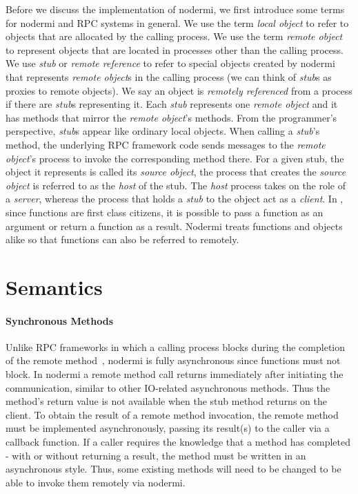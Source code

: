 Before we discuss the implementation of nodermi,
we first introduce some terms for nodermi and
RPC systems in general.
We use the term \emph{local object}
to refer to objects that are allocated by the calling process.
We use the term \emph{remote object} to represent objects that are
located in processes other than the calling process.
We use \emph{stub} or \emph{remote reference} to refer to special objects created
by nodermi that represents \emph{remote object}s in the calling process
(we can think of \emph{stub}s as proxies to remote objects).
We say an object is \emph{remotely referenced} from a process
if there are \emph{stub}s representing it.
Each \emph{stub} represents one \emph{remote object} and
it has methods that mirror the \emph{remote object}'s methods.
From the programmer's perspective,
\emph{stub}s appear like ordinary local objects.
When calling a \emph{stub}'s method, the underlying
RPC framework code sends messages to the \emph{remote object}'s process
to invoke the corresponding method there.
For a given stub,
the object it represents is called its \emph{source object},
the process that creates the \emph{source object}
is referred to as the \emph{host} of the stub.
The \emph{host} process takes on the role of a \emph{server},
whereas the process that holds a \emph{stub} to the object act as a \emph{client}.
In \js{}, since functions are first class citizens, it is possible
to pass a function as an argument or return a function as a result.
Nodermi treats functions and objects alike so that functions can also be
referred to remotely.


\section{Semantics}
\label{sec:semantics}

\nodermiexamplefig{}

\paragraph{Synchronous Methods}
Unlike RPC frameworks in which a calling process blocks during the
completion of the remote method~\cite{birrell1984implementing},
nodermi is fully asynchronous since \js{} functions must not block.
In nodermi a remote method call returns immediately after initiating the communication,
similar to other IO-related asynchronous methods.
Thus the method's return value is not available when the stub method returns on the client.
To obtain the result of a remote method invocation,
the remote method must be implemented asynchronously,
passing its result(s) to the caller via a callback function.
If a caller requires the knowledge that a method has completed - with or without
returning a result, the method must be written in an asynchronous style.
Thus, some existing methods will need to be changed to be able to invoke them
remotely via nodermi.

